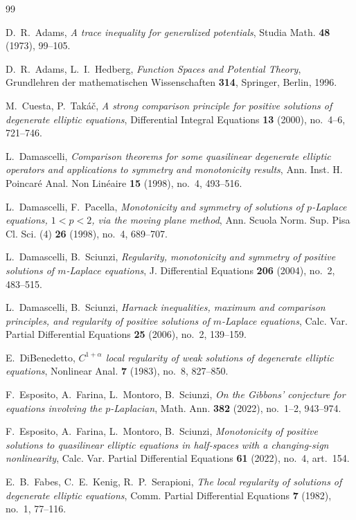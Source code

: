 \documentclass[reqno]{amsart}
\theoremstyle{plain}
\theoremstyle{definition}
\theoremstyle{remark}
\begin{document}
\begin{thebibliography}{99}

 D.~R.~Adams, \emph{A trace inequality for generalized potentials}, Studia Math.
\textbf{48} (1973), 99--105.

 D.~R.~Adams, L.~I.~Hedberg, \emph{Function Spaces and Potential Theory},
Grundlehren der mathematischen Wissenschaften \textbf{314}, Springer, Berlin, 1996.

 M.~Cuesta, P.~Tak\'a\v{c}, \emph{A strong comparison principle for positive solutions of
degenerate elliptic equations}, Differential Integral Equations \textbf{13} (2000), no.~4--6,
721--746.

 L.~Damascelli, \emph{Comparison theorems for some quasilinear degenerate elliptic
operators and applications to symmetry and monotonicity results}, Ann. Inst. H. Poincar\'e Anal. Non
Lin\'eaire \textbf{15} (1998), no.~4, 493--516.

 L.~Damascelli, F.~Pacella, \emph{Monotonicity and symmetry of solutions of
$p$-Laplace equations, $1<p<2$, via the moving plane method}, Ann. Scuola Norm. Sup. Pisa Cl. Sci.
(4) \textbf{26} (1998), no.~4, 689--707.

 L.~Damascelli, B.~Sciunzi, \emph{Regularity, monotonicity and symmetry of positive
solutions of $m$-Laplace equations}, J. Differential Equations \textbf{206} (2004), no.~2, 483--515.

 L.~Damascelli, B.~Sciunzi, \emph{Harnack inequalities, maximum and comparison
principles, and regularity of positive solutions of $m$-Laplace equations}, Calc. Var. Partial
Differential Equations \textbf{25} (2006), no.~2, 139--159.

 E.~DiBenedetto, \emph{$C^{1+\alpha}$ local regularity of weak solutions of degenerate
elliptic equations}, Nonlinear Anal. \textbf{7} (1983), no.~8, 827--850.

 F.~Esposito, A.~Farina, L.~Montoro, B.~Sciunzi, \emph{On the Gibbons' conjecture
for equations involving the $p$-Laplacian}, Math. Ann. \textbf{382} (2022), no.~1--2, 943--974.

 F.~Esposito, A.~Farina, L.~Montoro, B.~Sciunzi, \emph{Monotonicity of positive
solutions to quasilinear elliptic equations in half-spaces with a changing-sign nonlinearity},
Calc. Var. Partial Differential Equations \textbf{61} (2022), no.~4, art.~154.

 E.~B.~Fabes, C.~E.~Kenig, R.~P.~Serapioni, \emph{The local regularity of solutions of
degenerate elliptic equations}, Comm. Partial Differential Equations \textbf{7} (1982), no.~1,
77--116.


\end{thebibliography}
\end{document}
